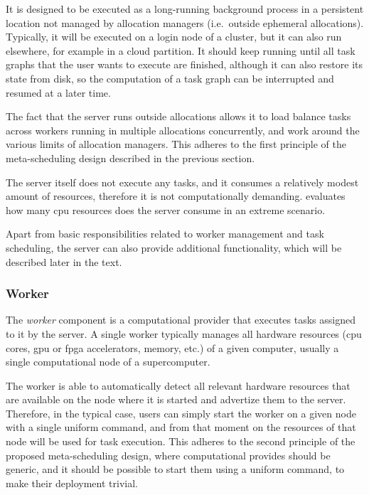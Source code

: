 It is designed to be executed as a long-running background process in a persistent location not
managed by allocation managers (i.e.\ outside ephemeral allocations). Typically, it will be
executed on a login node of a cluster, but it can also run elsewhere, for example in a cloud
partition. It should keep running until all task graphs that the user wants to execute are
finished, although it can also restore its state from disk, so the computation of a task graph can
be interrupted and resumed at a later time.

The fact that the server runs outside allocations allows it to load balance tasks across workers
running in multiple allocations concurrently, and work around the various limits of allocation
managers. This adheres to the first principle of the meta-scheduling design described in the
previous section.

The \hq{} server itself does not execute any tasks, and it consumes a relatively
modest amount of resources, therefore it is not computationally demanding. 
evaluates how many \gls{cpu} resources does the server consume in an extreme
scenario.

Apart from basic responsibilities related to worker management and task scheduling, the server can
also provide additional functionality, which will be described later in the text.

\subsubsection*{Worker}
The \emph{worker} component is a computational provider that executes tasks assigned to
it by the server. A single worker typically manages all hardware resources (\gls{cpu}
cores, \gls{gpu} or \gls{fpga} accelerators, memory, etc.) of a given
computer, usually a single computational node of a supercomputer.

The worker is able to automatically detect all relevant hardware resources that are available on
the node where it is started and advertize them to the server. Therefore, in the typical case,
users can simply start the worker on a given node with a single uniform command, and from that
moment on the resources of that node will be used for task execution. This adheres to the second
principle of the proposed meta-scheduling design, where computational provides should be generic,
and it should be possible to start them using a uniform command, to make their deployment trivial.

